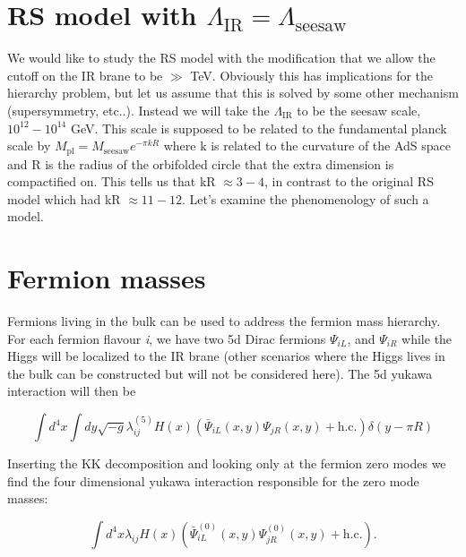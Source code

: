 \documentclass[aps,onecolumn,twoside,secnumarabic,balancelastpage,amsmath,amssymb,nofootinbib,hyperref=pdftex]{revtex4}
\begin{document}
\title{}
\author         {Noah Steinberg}
\date{\today}

\maketitle

\section{RS model with $\Lambda_{\text{IR}} = \Lambda_{\text{seesaw}}$}
We would like to study the RS model with the modification that we allow the cutoff on the IR brane to be $\gg$ TeV. Obviously this has implications for the hierarchy problem, but let us assume that this is solved by some other mechanism (supersymmetry, etc..). Instead we will take the $\Lambda_{\text{IR}}$ to be the seesaw scale, $10^{12} - 10^{14}$ GeV. This scale is supposed to be related to the fundamental planck scale by $M_{\text{pl}} = M_{\text{seesaw}}e^{-\pi kR}$ where k is related to the curvature of the AdS space and R is the radius of the orbifolded circle that the extra dimension is compactified on. This tells us that kR $\approx 3 - 4$, in contrast to the original RS model which had kR $\approx 11 - 12$. Let's examine the phenomenology of such a model. 

\section{Fermion masses}

Fermions living in the bulk can be used to address the fermion mass hierarchy. For each fermion flavour \textit{i}, we have two 5d Dirac fermions $\Psi_{iL}$, and $\Psi_{iR}$ while the Higgs will be localized to the IR brane (other scenarios where the Higgs lives in the bulk can be constructed but will not be considered here). The 5d yukawa interaction will then be

\begin{equation}
\int d^{4}x\int dy\sqrt{-g} \lambda^{(5)}_{ij}H(x)(\bar{\Psi}_{iL}(x,y)\Psi_{jR}(x,y) + \text{h.c.})\delta(y - \pi R)
\end{equation}

Inserting the KK decomposition and looking only at the fermion zero modes we find the four dimensional yukawa interaction responsible for the zero mode masses:

\begin{equation}
\int d^{4}x\lambda_{ij}H(x)(\bar{\Psi}^{(0)}_{iL}(x,y)\Psi^{(0)}_{jR}(x,y) + \text{h.c.}).
\end{equation}
\end{document}

